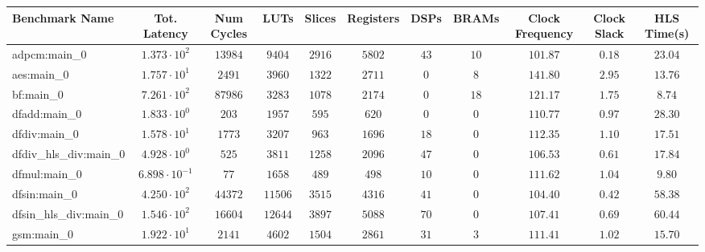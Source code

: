 \begin{tabular}{|l|c|c|c|c|c|c|c|c|c|c|}
\hline
Benchmark Name          & Tot. Latency            & Num Cycles & LUTs      & Slices    & Registers & DSPs    & BRAMs   & Clock Frequency & Clock Slack & HLS Time(s) \\
\hline
adpcm:main\_0           & $ 1.373 \cdot 10^{2}  $ & $ 13984  $ & $ 9404  $ & $ 2916  $ & $ 5802  $ & $ 43  $ & $ 10  $ & $ 101.87      $ & $ 0.18    $ & $ 23.04   $ \\
aes:main\_0             & $ 1.757 \cdot 10^{1}  $ & $ 2491   $ & $ 3960  $ & $ 1322  $ & $ 2711  $ & $ 0   $ & $ 8   $ & $ 141.80      $ & $ 2.95    $ & $ 13.76   $ \\
bf:main\_0              & $ 7.261 \cdot 10^{2}  $ & $ 87986  $ & $ 3283  $ & $ 1078  $ & $ 2174  $ & $ 0   $ & $ 18  $ & $ 121.17      $ & $ 1.75    $ & $ 8.74    $ \\
dfadd:main\_0           & $ 1.833 \cdot 10^{0}  $ & $ 203    $ & $ 1957  $ & $ 595   $ & $ 620   $ & $ 0   $ & $ 0   $ & $ 110.77      $ & $ 0.97    $ & $ 28.30   $ \\
dfdiv:main\_0           & $ 1.578 \cdot 10^{1}  $ & $ 1773   $ & $ 3207  $ & $ 963   $ & $ 1696  $ & $ 18  $ & $ 0   $ & $ 112.35      $ & $ 1.10    $ & $ 17.51   $ \\
dfdiv\_hls\_div:main\_0 & $ 4.928 \cdot 10^{0}  $ & $ 525    $ & $ 3811  $ & $ 1258  $ & $ 2096  $ & $ 47  $ & $ 0   $ & $ 106.53      $ & $ 0.61    $ & $ 17.84   $ \\
dfmul:main\_0           & $ 6.898 \cdot 10^{-1} $ & $ 77     $ & $ 1658  $ & $ 489   $ & $ 498   $ & $ 10  $ & $ 0   $ & $ 111.62      $ & $ 1.04    $ & $ 9.80    $ \\
dfsin:main\_0           & $ 4.250 \cdot 10^{2}  $ & $ 44372  $ & $ 11506 $ & $ 3515  $ & $ 4316  $ & $ 41  $ & $ 0   $ & $ 104.40      $ & $ 0.42    $ & $ 58.38   $ \\
dfsin\_hls\_div:main\_0 & $ 1.546 \cdot 10^{2}  $ & $ 16604  $ & $ 12644 $ & $ 3897  $ & $ 5088  $ & $ 70  $ & $ 0   $ & $ 107.41      $ & $ 0.69    $ & $ 60.44   $ \\
gsm:main\_0             & $ 1.922 \cdot 10^{1}  $ & $ 2141   $ & $ 4602  $ & $ 1504  $ & $ 2861  $ & $ 31  $ & $ 3   $ & $ 111.41      $ & $ 1.02    $ & $ 15.70   $ \\

\end{tabular}
